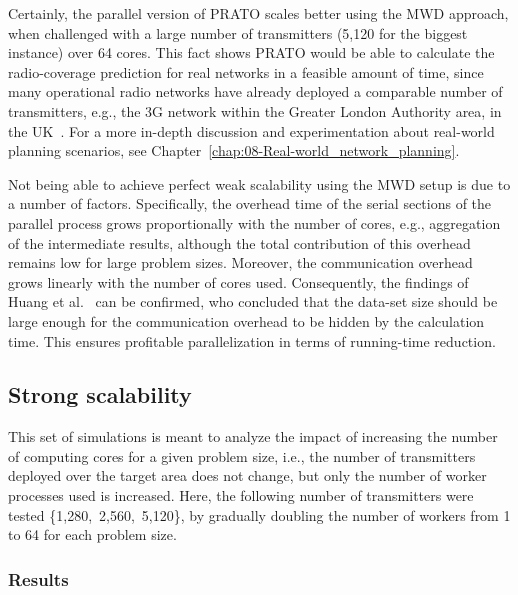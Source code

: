 Certainly, the parallel version of PRATO scales better using the MWD
approach, when challenged with a large number of transmitters (5,120
for the biggest instance) over 64 cores. This fact shows PRATO would
be able to calculate the radio-coverage prediction for real networks
in a feasible amount of time, since many operational radio networks
have already deployed a comparable number of transmitters, e.g., the
3G network within the Greater London Authority area, in the UK~\cite{Number_of_base_stations_in_England}.
For a more in-depth discussion and experimentation about real-world
planning scenarios, see Chapter~\ref{chap:08-Real-world_network_planning}.

Not being able to achieve perfect weak scalability using the MWD setup
is due to a number of factors. Specifically, the overhead time of
the serial sections of the parallel process grows proportionally with
the number of cores, e.g., aggregation of the intermediate results,
although the total contribution of this overhead remains low for large
problem sizes. Moreover, the communication overhead grows linearly
with the number of cores used. Consequently, the findings of Huang
et al.~\cite{Huang-Explorations_of_the_implementation_of_a_parallel_IDW_algorithm_in_a_Linux_cluster:2011}
can be confirmed, who concluded that the data-set size should be large
enough for the communication overhead to be hidden by the calculation
time. This ensures profitable parallelization in terms of running-time
reduction.


\subsection{Strong scalability \label{sub:04-Strong_scalability}}

This set of simulations is meant to analyze the impact of increasing
the number of computing cores for a given problem size, i.e., the
number of transmitters deployed over the target area does not change,
but only the number of worker processes used is increased. Here, the
following number of transmitters were tested \{1,280,~2,560,~5,120\},
by gradually doubling the number of workers from 1 to 64 for each
problem size.


\subsubsection*{Results}

